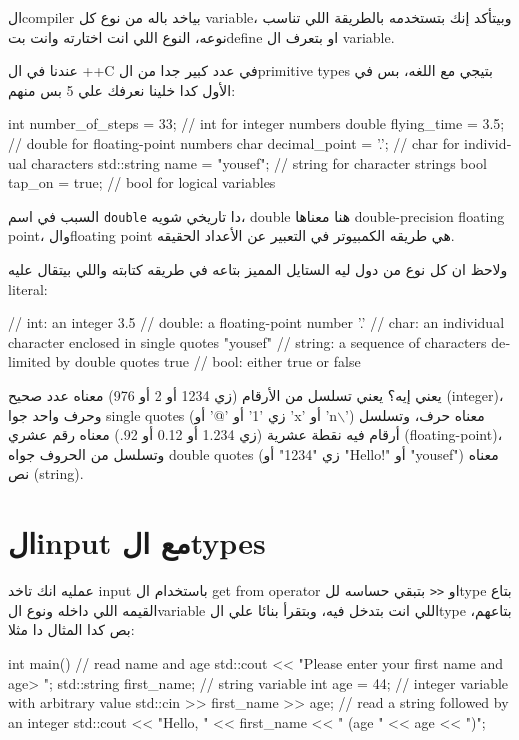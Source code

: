 \documentclass[11pt]{article}
\let\OriginalVerbatim\verbatim
\let\endOriginalVerbatim\endverbatim
\renewenvironment{verbatim}{\begin{english}\OriginalVerbatim}{\endOriginalVerbatim\end{english}}
\begin{document}
الcompiler بياخد باله من نوع كل variable، وبيتأكد إنك بتستخدمه بالطريقة اللي تناسب نوعه، النوع اللي انت اختارته وانت بتdefine او بتعرف ال variable.

عندنا في ال ++C في عدد كبير جدا من الprimitive types بتيجي مع اللغه، بس في الأول كدا خلينا نعرفك علي 5 بس منهم:

\begin{verbatim}
int number_of_steps = 33;     // int for integer numbers
double flying_time = 3.5;     // double for floating-point numbers
char decimal_point = '.';     // char for individual characters
std::string name = "yousef";  // string for character strings
bool tap_on = true;           // bool for logical variables
\end{verbatim}

السبب في اسم \texttt{double} دا تاريخي شويه، double هنا معناها double-precision floating point، والfloating point هي طريقه الكمبيوتر في التعبير عن الأعداد الحقيقه.

ولاحظ ان كل نوع من دول ليه الستايل المميز بتاعه في طريقه كتابته واللي بيتقال عليه literal:

\begin{verbatim}
33        // int: an integer
3.5       // double: a floating-point number
'.'       // char: an individual character enclosed in single quotes
"yousef"  // string: a sequence of characters delimited by double quotes
true      // bool: either true or false
\end{verbatim}

يعني إيه؟ يعني تسلسل من الأرقام (زي 1234 أو 2 أو 976) معناه عدد صحيح (integer)، وحرف واحد جوا single quotes (زي '1' أو '@' أو 'x' أو 'n$\backslash$') معناه حرف، وتسلسل أرقام فيه نقطة عشرية (زي 1.234 أو 0.12 أو 92.) معناه رقم عشري (floating-point)، وتسلسل من الحروف جواه double quotes (زي "1234" أو "Hello!\n" أو "yousef") معناه نص (string).
\section{الinput مع الtypes}
\label{sec:org9835fb5}
عمليه انك تاخد input باستخدام ال get from operator او \texttt{<{}<{}} بتبقي حساسه للtype بتاع القيمه اللي داخله ونوع الvariable اللي انت بتدخل فيه، وبتقرأ بنائا علي الtype بتاعهم، بص كدا المثال دا مثلا:

\begin{verbatim}
int main() {
    // read name and age
    std::cout << "Please enter your first name and age\n> ";
    std::string first_name;          // string variable
    int age = 44;                    // integer variable with arbitrary value
    std::cin >> first_name >> age;   // read a string followed by an integer
    std::cout << "Hello, " << first_name << " (age " << age << ")\n";
}
\end{verbatim}
\end{document}
